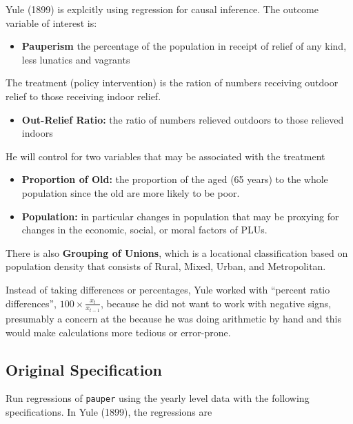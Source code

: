 \documentclass[]{article}
\providecommand{\tightlist}{%
  \setlength{\itemsep}{0pt}\setlength{\parskip}{0pt}}
\begin{document}
Yule (1899) is explcitly using regression for causal inference. The
outcome variable of interest is:

\begin{itemize}
\tightlist
\item
  \textbf{Pauperism} the percentage of the population in receipt of
  relief of any kind, less lunatics and vagrants
\end{itemize}

The treatment (policy intervention) is the ration of numbers receiving
outdoor relief to those receiving indoor relief.

\begin{itemize}
\tightlist
\item
  \textbf{Out-Relief Ratio:} the ratio of numbers relieved outdoors to
  those relieved indoors
\end{itemize}

He will control for two variables that may be associated with the
treatment

\begin{itemize}
\tightlist
\item
  \textbf{Proportion of Old:} the proportion of the aged (65 years) to
  the whole population since the old are more likely to be poor.
\item
  \textbf{Population:} in particular changes in population that may be
  proxying for changes in the economic, social, or moral factors of
  PLUs.
\end{itemize}

There is also \textbf{Grouping of Unions}, which is a locational
classification based on population density that consists of Rural,
Mixed, Urban, and Metropolitan.

Instead of taking differences or percentages, Yule worked with ``percent
ratio differences'', \(100 \times \frac{x_{t}}{x_{t-1}}\), because he
did not want to work with negative signs, presumably a concern at the
because he was doing arithmetic by hand and this would make calculations
more tedious or error-prone.

\subsection{Original Specification}\label{original-specification}

Run regressions of \texttt{pauper} using the yearly level data with the
following specifications. In Yule (1899), the regressions are
\end{document}
